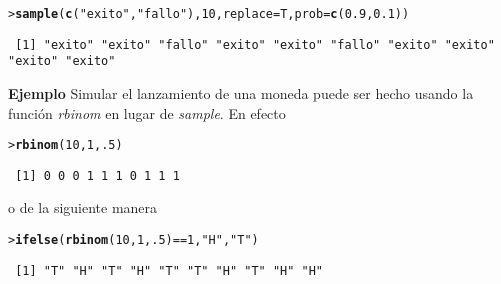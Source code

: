 \documentclass{article}\usepackage[]{graphicx}\usepackage[]{color}
\makeatletter
\newcommand{\hlnum}[1]{\textcolor[rgb]{0.686,0.059,0.569}{#1}}%
\newcommand{\hlstr}[1]{\textcolor[rgb]{0.192,0.494,0.8}{#1}}%
\newcommand{\hlopt}[1]{\textcolor[rgb]{0,0,0}{#1}}%
\newcommand{\hlstd}[1]{\textcolor[rgb]{0.345,0.345,0.345}{#1}}%
\newcommand{\hlkwc}[1]{\textcolor[rgb]{0.333,0.667,0.333}{#1}}%
\newcommand{\hlkwd}[1]{\textcolor[rgb]{0.737,0.353,0.396}{\textbf{#1}}}%
\newenvironment{kframe}{%
 \def\at@end@of@kframe{}%
 \ifinner\ifhmode%
  \def\at@end@of@kframe{\end{minipage}}%
  \begin{minipage}{\columnwidth}%
 \fi\fi%
 \def\FrameCommand##1{\hskip\@totalleftmargin \hskip-\fboxsep
 \colorbox{shadecolor}{##1}\hskip-\fboxsep
     \hskip-\linewidth \hskip-\@totalleftmargin \hskip\columnwidth}%
 \MakeFramed {\advance\hsize-\width
   \@totalleftmargin\z@ \linewidth\hsize
   \@setminipage}}%
 {\par\unskip\endMakeFramed%
 \at@end@of@kframe}
\newenvironment{knitrout}{}{} %
\makeatother
\begin{document}
\begin{knitrout}
\color{fgcolor}\begin{kframe}
\begin{alltt}
\hlstd{> }\hlkwd{sample}\hlstd{(}\hlkwd{c}\hlstd{(}\hlstr{"exito"}\hlstd{,} \hlstr{"fallo"}\hlstd{),} \hlnum{10}\hlstd{,} \hlkwc{replace}\hlstd{=T,} \hlkwc{prob}\hlstd{=}\hlkwd{c}\hlstd{(}\hlnum{0.9}\hlstd{,} \hlnum{0.1}\hlstd{))}
\end{alltt}
\begin{verbatim}
 [1] "exito" "exito" "fallo" "exito" "exito" "fallo" "exito" "exito" "exito" "exito"
\end{verbatim}
\end{kframe}
\end{knitrout}

\vspace{0.3cm}

\textbf{Ejemplo} Simular el lanzamiento de una moneda puede ser hecho usando la funci\'on \textit{rbinom} en lugar de \textit{sample}. En efecto

\begin{knitrout}
\color{fgcolor}\begin{kframe}
\begin{alltt}
\hlstd{> }\hlkwd{rbinom}\hlstd{(}\hlnum{10}\hlstd{,} \hlnum{1}\hlstd{,} \hlnum{.5}\hlstd{)}
\end{alltt}
\begin{verbatim}
 [1] 0 0 0 1 1 1 0 1 1 1
\end{verbatim}
\end{kframe}
\end{knitrout}

o de la siguiente manera


\begin{knitrout}
\color{fgcolor}\begin{kframe}
\begin{alltt}
\hlstd{> }\hlkwd{ifelse}\hlstd{(}\hlkwd{rbinom}\hlstd{(}\hlnum{10}\hlstd{,} \hlnum{1}\hlstd{,} \hlnum{.5}\hlstd{)} \hlopt{==} \hlnum{1}\hlstd{,} \hlstr{"H"}\hlstd{,} \hlstr{"T"}\hlstd{)}
\end{alltt}
\begin{verbatim}
 [1] "T" "H" "T" "H" "T" "T" "H" "T" "H" "H"
\end{verbatim}
\end{kframe}
\end{knitrout}
\end{document}
